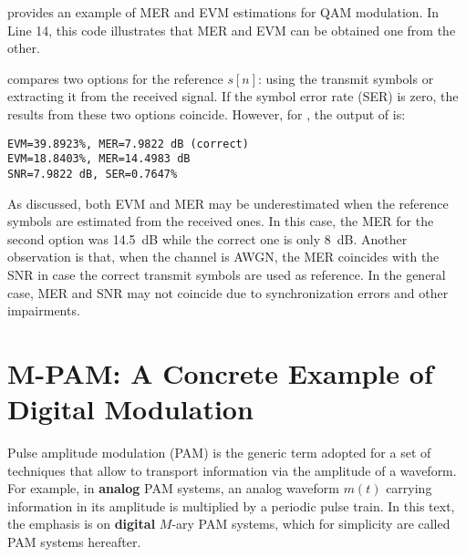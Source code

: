 
 provides an example of MER and EVM estimations for QAM
modulation. In Line 14, this code illustrates that MER and EVM can be obtained one from
the other.




 compares two options for the reference $s[n]$: using the
transmit symbols or extracting it from the received signal. If the symbol error rate (SER)
is zero, the results from these two options coincide. However, for , the output 
of  is:
\begin{verbatim}
EVM=39.8923%, MER=7.9822 dB (correct)
EVM=18.8403%, MER=14.4983 dB
SNR=7.9822 dB, SER=0.7647%
\end{verbatim}
As discussed, both EVM and MER may be underestimated when the reference symbols
are estimated from the received ones. In this case, the MER for the second option
was 14.5~dB while the correct one is only 8~dB. Another observation is that, when
the channel is AWGN, the MER coincides with the SNR in case the correct transmit
symbols are used as reference. In the general case, MER and SNR may not coincide
due to synchronization errors and other impairments.




\section{M-PAM: A Concrete Example of Digital Modulation}

Pulse amplitude modulation (PAM) is the generic term adopted for a set of techniques that allow to transport  information via the amplitude of a waveform. For example, in \textbf{analog} PAM systems, an analog waveform $m(t)$ carrying information in its amplitude is multiplied by a periodic pulse train. In this text, the emphasis is on \textbf{digital} $M$-ary PAM systems, which for simplicity are called PAM systems hereafter.

